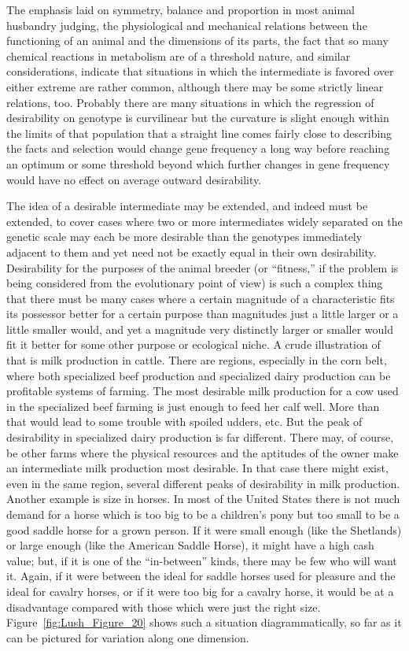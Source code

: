 The emphasis laid on symmetry, balance and proportion in most
animal husbandry judging, the physiological and mechanical relations
between the functioning of an animal and the dimensions of its parts,
the fact that so many chemical reactions in metabolism are of a threshold
nature, and similar considerations, indicate that situations in which
the intermediate is favored over either extreme are rather common,
although there may be some strictly linear relations, too. Probably
there are many situations in which the regression of desirability on
genotype is curvilinear but the curvature is slight enough within the
limits of that population that a straight line comes fairly close to
describing the facts and selection would change gene frequency a long
way before reaching an optimum or some threshold beyond which
further changes in gene frequency would have no effect on average outward
desirability.

The idea of a desirable intermediate may be extended, and indeed
must be extended, to cover cases where two or more intermediates
widely separated on the genetic scale may each be more desirable than
the genotypes immediately adjacent to them and yet need not be exactly
equal in their own desirability. Desirability for the purposes of the
animal breeder (or ``fitness,'' if the problem is being considered from
the evolutionary point of view) is such a complex thing that there must
be many cases where a certain magnitude of a characteristic fits its possessor
better for a certain purpose than magnitudes just a little larger or
a little smaller would, and yet a magnitude very distinctly larger or
smaller would fit it better for some other purpose or ecological niche.
A crude illustration of that is milk production in cattle. There are
regions, especially in the corn belt, where both specialized beef production
and specialized dairy production can be profitable systems of farming.
The most desirable milk production for a cow used in the
specialized beef farming is just enough to feed her calf well. More than
that would lead to some trouble with spoiled udders, etc. But the peak
of desirability in specialized dairy production is far different. There
may, of course, be other farms where the physical resources and the
aptitudes of the owner make an intermediate milk production most
desirable. In that case there might exist, even in the same region, several
different peaks of desirability in milk production. Another example is
size in horses. In most of the United States there is not much demand
for a horse which is too big to be a children's pony but too small to be a
good saddle horse for a grown person. If it were small enough (like the
Shetlands) or large enough (like the American Saddle Horse), it might
have a high cash value; but, if it is one of the ``in-between'' kinds, there
may be few who will want it. Again, if it were between the ideal for
saddle horses used for pleasure and the ideal for cavalry horses, or if it
were too big for a cavalry horse, it would be at a disadvantage compared
with those which were just the right size. Figure~\ref{fig:Lush_Figure_20} shows such a
situation diagrammatically, so far as it can be pictured for variation
along one dimension.

